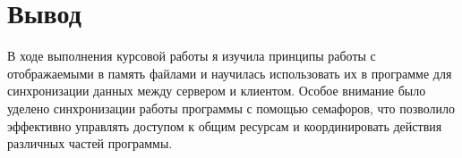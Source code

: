 \documentclass[a4paper, 14pt]{article}
\begin{document}
\section*{Вывод}

В ходе выполнения курсовой работы я изучила принципы работы с отображаемыми в память файлами и научилась использовать их в программе для синхронизации данных между сервером и клиентом. Особое внимание было уделено синхронизации работы программы с помощью семафоров, что позволило эффективно управлять доступом к общим ресурсам и координировать действия различных частей программы.
\end{document}
